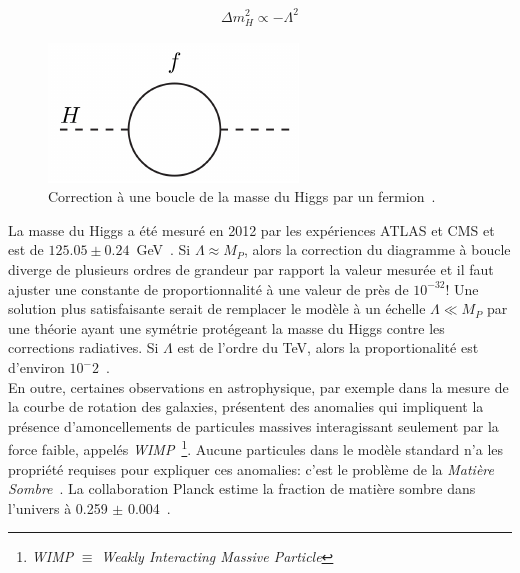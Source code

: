 \begin{eqnarray}
\label{eq:higgs_fermion_corr}
\Delta m_H^2 \propto -\Lambda^2
\end{eqnarray}

\begin{figure}
  \centering
  \includegraphics{higgs-loop.pdf}
  \caption{Correction à une boucle de la masse du Higgs par un
    fermion~\cite{martin_supersymmetry_1997}.}
  \label{fig:hloop}
\end{figure}

La masse du Higgs a été mesuré en 2012 par les expériences ATLAS et
CMS et est de
$125.05 \pm 0.24$~GeV~\cite{atlas_collaboration_combined_2015}. Si
$\Lambda \approx M_P$, alors la correction du diagramme à boucle
diverge de plusieurs ordres de grandeur par rapport la valeur mesurée
et il faut ajuster une constante de proportionnalité à une
valeur de près de $10^{-32}$! Une solution plus satisfaisante serait
de remplacer le modèle à un échelle $\Lambda \ll M_P$ par une théorie
ayant une symétrie protégeant la masse du Higgs contre les corrections
radiatives. Si $\Lambda$ est de l'ordre du TeV, alors la
proportionalité est d'environ $10^-2$~\cite{giudice_naturally_20087}. \\

En outre, certaines observations en astrophysique, par exemple dans la
mesure de la courbe de rotation des galaxies, présentent des anomalies
qui impliquent la présence d'amoncellements de particules massives
interagissant seulement par la force faible, appelés
\emph{WIMP}~\footnote{\emph{WIMP} $\equiv$ \emph{Weakly Interacting
Massive Particle}}. Aucune particules dans le modèle standard n'a les
propriété requises pour expliquer ces anomalies: c'est le problème de
la \emph{Matière Sombre}~\cite{bertone_particle_2005}. La
collaboration Planck estime la fraction de matière sombre dans
l'univers à 0.259 $\pm$ 0.004~\cite{planck_collaboration_planck_2015}.\\

